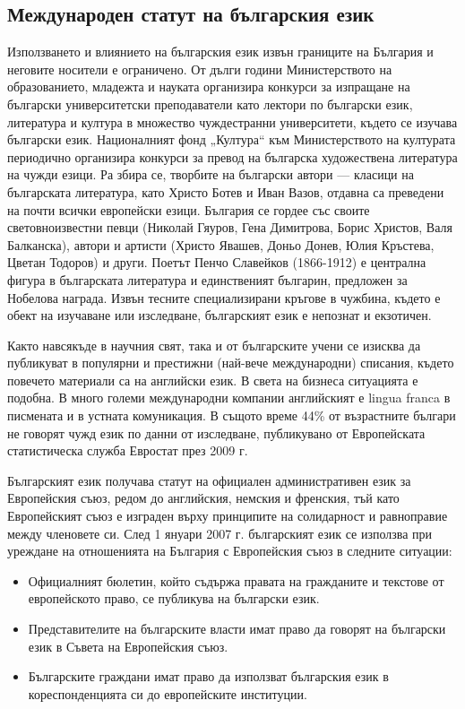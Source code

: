 \documentclass[]{../../metanetpaper}
\begin{document}
\begin{multicols}{2}
\subsection{Международен статут на българския език}

Използването и влиянието на българския език извън границите на България и неговите носители е ограничено. От дълги години Министерството на образованието, младежта и науката организира конкурси за изпращане на български университетски преподаватели като лектори по български език, литература и култура в множество чуждестранни университети, където се изучава български език. Националният фонд „Култура“ към Министерството на културата периодично организира конкурси за превод на българска художествена литература на чужди езици. Ра
 збира се, творбите на български автори — класици на българската литература, като Христо Ботев и Иван Вазов, отдавна са преведени на почти всички европейски езици. 
България се гордее със своите световноизвестни певци (Николай Гяуров,
 Гена Димитрова, Борис Христов, Валя Балканска), автори и артисти (Христо Явашев, Доньо Донев, Юлия Кръстева, Цветан Тодоров) и други. Поетът Пенчо Славейков (1866-1912) е централна фигура в българската литература и единственият българин, предложен за Нобелова награда. Извън тесните специализирани кръгове в чужбина, където е обект на изучаване или изследване, българският език е непознат и екзотичен. 

Както навсякъде в научния свят, така и от българските учени се изисква да публикуват в популярни и престижни (най-вече международни) списания, където повечето материали са на английски език. В света на бизнеса ситуацията е подобна. В много големи международни компании английският е lingua franca в писмената и в устната комуникация. В същото време 44\% от възрастните българи не говорят чужд език по данни от изследване, публикувано от Европейската статистическа служба Евростат \cite{epp} през 2009 г.

Българският език получава статут на официален административен език за Европейския съюз, редом до английския, немския и френския, тъй като Европейският съюз е изграден върху принципите на солидарност и равноправие между членовете си. След 1 януари 2007 г. българският език се използва при уреждане на отношенията на България с Европейския съюз в следните ситуации:
 
\begin{itemize}
\item Официалният бюлетин, който съдържа правата на гражданите и текстове от европейското право, се публикува на български език. 
\item Представителите на българските власти имат право да говорят на български език в Съвета на Европейския съюз. 
\item Българските граждани имат право да използват българския език в кореспонденцията си до европейските институции.
\end{itemize}


\end{multicols}
\end{document}
